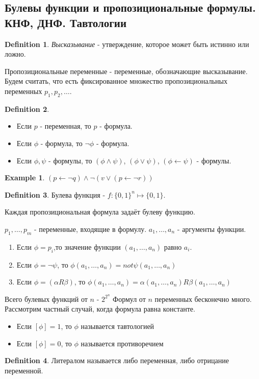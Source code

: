 \documentclass[a4paper]{article}
\theoremstyle{plain}
\newtheorem{example}{Example}
\theoremstyle{remark}
\theoremstyle{definition}
\newtheorem{definition}{Definition}
\begin{document}
\subsection{Булевы функции и пропозициональные формулы. КНФ, ДНФ. Тавтологии}
\begin{definition}
	\emph{Высказывание} - утверждение, которое может быть истинно или ложно.
\end{definition}
Пропозициональные переменные - переменные, обозначающие высказывание.
Будем считать, что есть фиксированное множество пропозициональных переменных $p_1, p_2, \ldots$.
\begin{definition}

	\begin{itemize}
		\item Если $p$ - переменная, то $p$ - формула.
		\item Если $\phi$ - формула, то $\lnot \phi$ - формула.
		\item Если $\phi, \psi$ - формулы, то $(\phi \land \psi)$, $(\phi \lor \psi)$, $(\phi \leftarrow \psi)$ - формулы.
	\end{itemize}
\end{definition}

\begin{example}
	$(p \leftarrow \lnot q) \land \lnot (v \lor (p \leftarrow \lnot r))$
\end{example}
\begin{definition}
	Булева функция - $f:\{0,1\}^n \mapsto \{0,1\}$.
\end{definition}

Каждая пропозициональная формула задаёт булеву функцию.

$p_1, \ldots, p_m$ - переменные, входящие в формулу.
$a_1, \ldots, a_n$ - аргументы функции.

\begin{enumerate}
	\item Если $\phi = p_i$,то значение функции $(a_1, \ldots, a_n)$ равно $a_i$.
	\item Если $\phi = \lnot \psi$, то $\phi(a_1, \ldots, a_n) = not \psi(a_1, \ldots, a_n)$
	\item Если $\phi = (\alpha R \beta)$, то $\phi(a_1, \ldots, a_n) = \alpha(a_1, \ldots, a_n) R \beta(a_1, \ldots, a_n)$
\end{enumerate}

Всего булевых функций от $n$ - $2 ^ {2 ^ n}$
Формул от $n$ переменных бесконечно много.
Рассмотрим частный случай, когда формула равна константе. 
\begin{itemize}
	\item Если $[\phi] = 1$, то $\phi$ называется тавтологией %
	\item Если $[\phi] = 0$, то $\phi$ называется противоречием
\end{itemize}
\begin{definition}
	Литералом называется либо переменная, либо отрицание переменной.
\end{definition}
\end{document}
